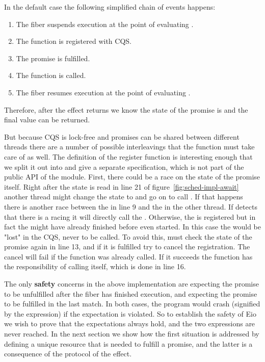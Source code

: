 In the default case the following simplified chain of events happens:
\begin{enumerate}
  \item The fiber suspends execution at the point of evaluating .
  \item The  function is registered with CQS.
  \item The promise is fulfilled.
  \item The  function is called.
  \item The fiber resumes execution at the point of evaluating .
\end{enumerate}
Therefore, after the \esuspend{} effect returns we know the state of the promise is  and the final value can be returned.

But because CQS is lock-free and promises can be shared between different threads there are a number of possible interleavings that the  function must take care of as well.
The definition of the register function is interesting enough that we split it out into  and give a separate specification, which is not part of the public API of the module.
First, there could be a race on the state of the promise itself.
Right after the state is read in line 21 of figure~\ref{fig:sched-impl-await} another thread might change the state to  and go on to call .
If that happens there is another race between the  in line 9 and the  in the other thread.
If  detects that there is a racing  it will directly call the .
Otherwise, the  is registered but in fact the  might have already finished before  even started.
In this case the  would be "lost" in the CQS, never to be called.
To avoid this,  must check the state of the promise again in line 13, and if it is fulfilled try to cancel the  registration.
The cancel will fail if the  function was already called.
If it succeeds the  function has the responsibility of calling  itself, which is done in line 16.

The only \textbf{safety} concerns in the above implementation are  expecting the promise to be unfulfilled after the fiber has finished execution, and  expecting the promise to be fulfilled in the last match.
In both cases, the program would crash (signified by the  expression) if the expectation is violated.
So to establish the safety of Eio we wish to prove that the expectations always hold, and the two  expressions are never reached.
In the next section we show how the first situation is addressed by defining a unique resource that is needed to fulfill a promise, and the latter is a consequence of the protocol of the \esuspend{} effect.

